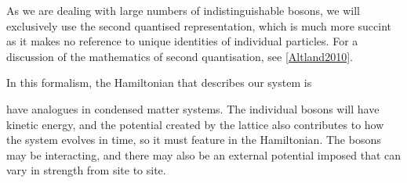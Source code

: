\documentclass[prb, twocolumn, final]{revtex4-1}
\theoremstyle{plain}
\begin{document}



As we are dealing with large numbers of indistinguishable bosons, we will
exclusively use the second quantised representation, which is much more succint
as it makes no reference to unique identities of individual particles. For a
discussion of the mathematics of second quantisation, see \ref{Altland2010}.

In this formalism, the Hamiltonian that describes our system is

 have analogues in condensed matter systems. The
individual bosons will have kinetic energy, and the potential created by the
lattice also contributes to how the system evolves in time, so it must feature
in the Hamiltonian. The bosons may be interacting, and there may also be an
external potential imposed that can vary in strength from site to site.
\end{document}
